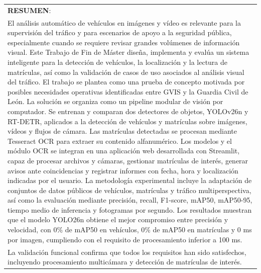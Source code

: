 \documentclass[12pt,a4paper,onecolumn,oneside]{report}
\begin{document}
\vspace{-1em}
\begin{longtable}{|p{16cm}|}
    \textbf{RESUMEN}:\\
    El análisis automático de vehículos en imágenes y vídeo es relevante para la supervisión del tráfico y para escenarios de apoyo a la seguridad pública, especialmente cuando se requiere revisar grandes volúmenes de información visual. Este Trabajo de Fin de Máster diseña, implementa y evalúa un sistema inteligente para la detección de vehículos, la localización y la lectura de matrículas, así como la validación de casos de uso asociados al análisis visual del tráfico. El trabajo se plantea como una prueba de concepto motivada por posibles necesidades operativas identificadas entre GVIS y la Guardia Civil de León. La solución se organiza como un pipeline modular de visión por computador. Se entrenan y comparan dos detectores de objetos, YOLOv26n y RT-DETR, aplicados a la detección de vehículos y matrículas sobre imágenes, vídeos y flujos de cámara. Las matrículas detectadas se procesan mediante Tesseract OCR para extraer su contenido alfanumérico. Los modelos y el módulo OCR se integran en una aplicación web desarrollada con Streamlit, capaz de procesar archivos y cámaras, gestionar matrículas de interés, generar avisos ante coincidencias y registrar informes con fecha, hora y localización indicadas por el usuario. La metodología experimental incluye la adaptación de conjuntos de datos públicos de vehículos, matrículas y tráfico multiperspectiva, así como la evaluación mediante precisión, recall, F1-score, mAP50, mAP50-95, tiempo medio de inferencia y fotogramas por segundo. Los resultados muestran que el modelo YOLO26n obtiene el mejor compromiso entre precisión y velocidad, con 0\% de mAP50 en vehículos,  0\% de mAP50 en matrículas y  0 ms por imagen, cumpliendo con el requisito de procesamiento inferior a 100 ms.\\ La validación funcional confirma que todos los requisitos han sido satisfechos, incluyendo procesamiento multicámara y detección de matrículas de interés.\\%
    \hline
\end{longtable}
\end{document}
